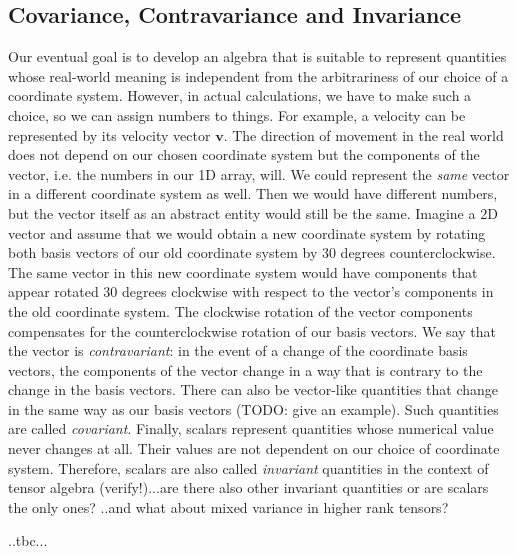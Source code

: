 \subsection{Covariance, Contravariance and Invariance}
Our eventual goal is to develop an algebra that is suitable to represent quantities whose real-world meaning is independent from the arbitrariness of our choice of a coordinate system. However, in actual calculations, we have to make such a choice, so we can assign numbers to things. For example, a velocity can be represented by its velocity vector $\mathbf{v}$. The direction of movement in the real world does not depend on our chosen coordinate system but the components of the vector, i.e. the numbers in our 1D array, will. We could represent the \emph{same} vector in a different coordinate system as well. Then we would have different numbers, but the vector itself as an abstract entity would still be the same. Imagine a 2D vector and assume that we would obtain a new coordinate system by rotating both basis vectors of our old coordinate system by 30 degrees counterclockwise. The same vector in this new coordinate system would have components that appear rotated 30 degrees clockwise with respect to the vector's components in the old coordinate system. The clockwise rotation of the vector components compensates for the counterclockwise rotation of our basis vectors. We say that the vector is \emph{contravariant}: in the event of a change of the coordinate basis vectors, the components of the vector change in a way that is contrary to the change in the basis vectors. There can also be vector-like quantities that change in the same way as our basis vectors (TODO: give an example). Such quantities are called \emph{covariant}. Finally, scalars represent quantities whose numerical value never changes at all. Their values are not dependent on our choice of coordinate system. Therefore, scalars are also called \emph{invariant} quantities in the context of tensor algebra (verify!)...are there also other invariant quantities or are scalars the only ones? ..and what about mixed variance in higher rank tensors?


..tbc...




